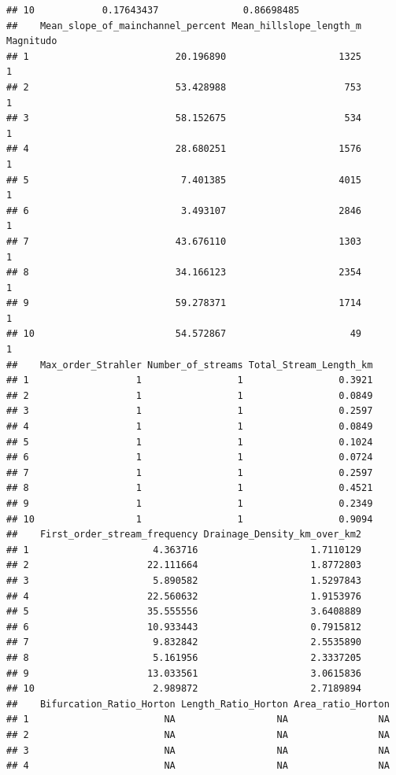 \documentclass[11pt,]{article}
\begin{document}
\begin{verbatim}
## 10            0.17643437               0.86698485
##    Mean_slope_of_mainchannel_percent Mean_hillslope_length_m Magnitudo
## 1                          20.196890                    1325         1
## 2                          53.428988                     753         1
## 3                          58.152675                     534         1
## 4                          28.680251                    1576         1
## 5                           7.401385                    4015         1
## 6                           3.493107                    2846         1
## 7                          43.676110                    1303         1
## 8                          34.166123                    2354         1
## 9                          59.278371                    1714         1
## 10                         54.572867                      49         1
##    Max_order_Strahler Number_of_streams Total_Stream_Length_km
## 1                   1                 1                 0.3921
## 2                   1                 1                 0.0849
## 3                   1                 1                 0.2597
## 4                   1                 1                 0.0849
## 5                   1                 1                 0.1024
## 6                   1                 1                 0.0724
## 7                   1                 1                 0.2597
## 8                   1                 1                 0.4521
## 9                   1                 1                 0.2349
## 10                  1                 1                 0.9094
##    First_order_stream_frequency Drainage_Density_km_over_km2
## 1                      4.363716                    1.7110129
## 2                     22.111664                    1.8772803
## 3                      5.890582                    1.5297843
## 4                     22.560632                    1.9153976
## 5                     35.555556                    3.6408889
## 6                     10.933443                    0.7915812
## 7                      9.832842                    2.5535890
## 8                      5.161956                    2.3337205
## 9                     13.033561                    3.0615836
## 10                     2.989872                    2.7189894
##    Bifurcation_Ratio_Horton Length_Ratio_Horton Area_ratio_Horton
## 1                        NA                  NA                NA
## 2                        NA                  NA                NA
## 3                        NA                  NA                NA
## 4                        NA                  NA                NA

\end{verbatim}
\end{document}

